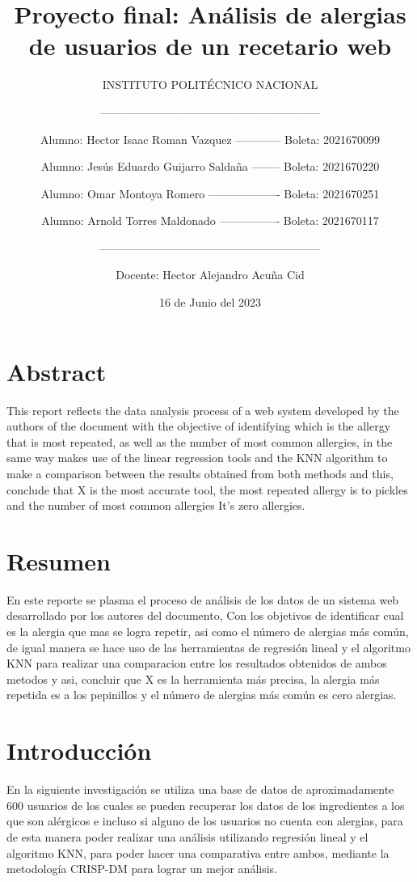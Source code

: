 \documentclass[
]{article}
\title{Proyecto final: Análisis de alergias de usuarios de un recetario
web}
\author{INSTITUTO POLITÉCNICO
NACIONAL \and ----------------------------------------------------------- \and Alumno:
Hector Isaac Roman Vazquez ------------ Boleta: 2021670099 \and Alumno:
Jesús Eduardo Guijarro Saldaña -------- Boleta: 2021670220 \and Alumno:
Omar Montoya Romero ------------------- Boleta: 2021670251 \and Alumno:
Arnold Torres Maldonado ---------------- Boleta:
2021670117 \and ----------------------------------------------------------- \and Docente:
Hector Alejandro Acuña Cid}
\date{16 de Junio del 2023}
\begin{document}
\maketitle

\hypertarget{abstract}{%
\section{Abstract}\label{abstract}}

This report reflects the data analysis process of a web system developed
by the authors of the document with the objective of identifying which
is the allergy that is most repeated, as well as the number of most
common allergies, in the same way makes use of the linear regression
tools and the KNN algorithm to make a comparison between the results
obtained from both methods and this, conclude that X is the most
accurate tool, the most repeated allergy is to pickles and the number of
most common allergies It's zero allergies.

\hypertarget{resumen}{%
\section{Resumen}\label{resumen}}

En este reporte se plasma el proceso de análisis de los datos de un
sistema web desarrollado por los autores del documento, Con los
objetivos de identificar cual es la alergia que mas se logra repetir,
asi como el número de alergias más común, de igual manera se hace uso de
las herramientas de regresión lineal y el algoritmo KNN para realizar
una comparacion entre los resultados obtenidos de ambos metodos y asi,
concluir que X es la herramienta más precisa, la alergia más repetida es
a los pepinillos y el número de alergias más común es cero alergias.

\hypertarget{introducciuxf3n}{%
\section{Introducción}\label{introducciuxf3n}}

En la siguiente investigación se utiliza una base de datos de
aproximadamente 600 usuarios de los cuales se pueden recuperar los datos
de los ingredientes a los que son alérgicos e incluso si alguno de los
usuarios no cuenta con alergias, para de esta manera poder realizar una
análisis utilizando regresión lineal y el algoritmo KNN, para poder
hacer una comparativa entre ambos, mediante la metodología CRISP-DM para
lograr un mejor análisis.
\end{document}
